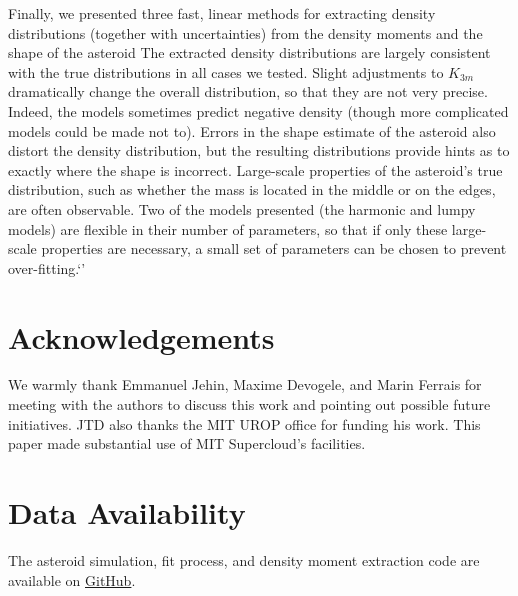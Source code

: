 \documentclass[fleqn,usenatbib]{mnras}
\begin{document}
Finally, we presented three fast, linear methods for extracting density distributions (together with uncertainties) from the density moments and the shape of the asteroid The extracted density distributions are largely consistent with the true distributions in all cases we tested. Slight adjustments to $K_{3m}$ dramatically change the overall distribution, so that they are not very precise. Indeed, the models sometimes predict negative density (though more complicated models could be made not to). Errors in the shape estimate of the asteroid also distort the density distribution, but the resulting distributions provide hints as to exactly where the shape is incorrect. Large-scale properties of the asteroid's true distribution, such as whether the mass is located in the middle or on the edges, are often observable. Two of the models presented (the harmonic and lumpy models) are flexible in their number of parameters, so that if only these large-scale properties are necessary, a small set of parameters can be chosen to prevent over-fitting.`'

\section*{Acknowledgements}

We warmly thank Emmanuel Jehin, Maxime Devogele, and Marin Ferrais for meeting with the authors to discuss this work and pointing out possible future initiatives. JTD also thanks the MIT UROP office for funding his work. This paper made substantial use of MIT Supercloud's facilities.



\section*{Data Availability}

The asteroid simulation, fit process, and density moment extraction code are available on \href{https://github.com/jack-dinsmore/asteroid-tidal-torque}{GitHub}.












\bsp	%
\label{lastpage}
\end{document}
